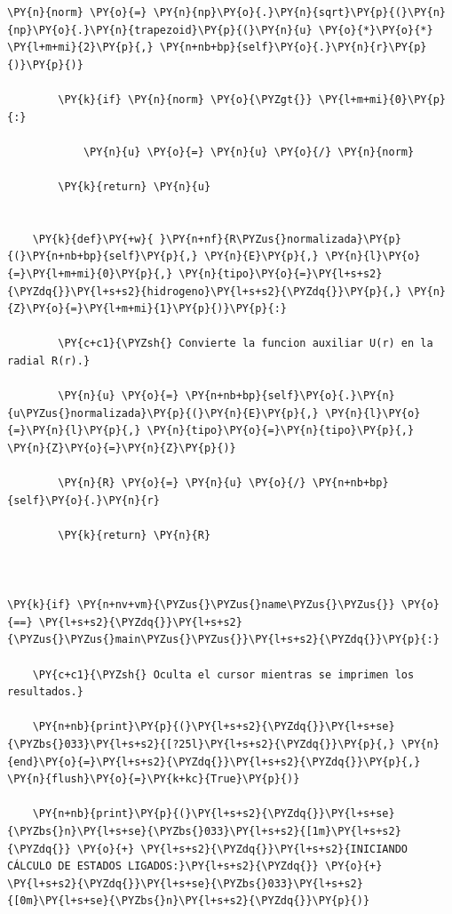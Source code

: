 \documentclass[11pt]{article}
\makeatletter
\def\PY@reset{\let\PY@it=\relax \let\PY@bf=\relax \let\PY@ul=\relax \let\PY@tc=\relax \let\PY@bc=\relax \let\PY@ff=\relax}
\def\PY@tok#1{\csname PY@tok@#1\endcsname}
\def\PY@toks#1+{\ifx\relax#1\empty\else \PY@tok{#1}\expandafter\PY@toks\fi}
\def\PY@do#1{\PY@bc{\PY@tc{\PY@ul{\PY@it{\PY@bf{\PY@ff{#1}}}}}}}
\def\PY#1#2{\PY@reset\PY@toks#1+\relax+\PY@do{#2}}
\def\PYZbs{\char`\\} \def\PYZus{\char`\_} \def\PYZob{\char`\{} \def\PYZcb{\char`\}} \def\PYZca{\char`\^} \def\PYZam{\char`\&} \def\PYZlt{\char`\<} \def\PYZgt{\char`\>} \def\PYZsh{\char`\#} \def\PYZpc{\char`\%} \def\PYZdl{\char`\$} \def\PYZhy{\char`\-} \def\PYZsq{\char`\'} \def\PYZdq{\char`\"} \def\PYZti{\char`\~}
\makeatother
\begin{document}
\begin{tcolorbox}[breakable, size=fbox, boxrule=1pt, pad at break*=1mm,colback=cellbackground, colframe=cellborder]
\begin{Verbatim}[commandchars=\\\{\}]
        \PY{n}{norm} \PY{o}{=} \PY{n}{np}\PY{o}{.}\PY{n}{sqrt}\PY{p}{(}\PY{n}{np}\PY{o}{.}\PY{n}{trapezoid}\PY{p}{(}\PY{n}{u} \PY{o}{*}\PY{o}{*} \PY{l+m+mi}{2}\PY{p}{,} \PY{n+nb+bp}{self}\PY{o}{.}\PY{n}{r}\PY{p}{)}\PY{p}{)}

        \PY{k}{if} \PY{n}{norm} \PY{o}{\PYZgt{}} \PY{l+m+mi}{0}\PY{p}{:}

            \PY{n}{u} \PY{o}{=} \PY{n}{u} \PY{o}{/} \PY{n}{norm}

        \PY{k}{return} \PY{n}{u}


    \PY{k}{def}\PY{+w}{ }\PY{n+nf}{R\PYZus{}normalizada}\PY{p}{(}\PY{n+nb+bp}{self}\PY{p}{,} \PY{n}{E}\PY{p}{,} \PY{n}{l}\PY{o}{=}\PY{l+m+mi}{0}\PY{p}{,} \PY{n}{tipo}\PY{o}{=}\PY{l+s+s2}{\PYZdq{}}\PY{l+s+s2}{hidrogeno}\PY{l+s+s2}{\PYZdq{}}\PY{p}{,} \PY{n}{Z}\PY{o}{=}\PY{l+m+mi}{1}\PY{p}{)}\PY{p}{:}

        \PY{c+c1}{\PYZsh{} Convierte la funcion auxiliar U(r) en la radial R(r).}

        \PY{n}{u} \PY{o}{=} \PY{n+nb+bp}{self}\PY{o}{.}\PY{n}{u\PYZus{}normalizada}\PY{p}{(}\PY{n}{E}\PY{p}{,} \PY{n}{l}\PY{o}{=}\PY{n}{l}\PY{p}{,} \PY{n}{tipo}\PY{o}{=}\PY{n}{tipo}\PY{p}{,} \PY{n}{Z}\PY{o}{=}\PY{n}{Z}\PY{p}{)}

        \PY{n}{R} \PY{o}{=} \PY{n}{u} \PY{o}{/} \PY{n+nb+bp}{self}\PY{o}{.}\PY{n}{r}

        \PY{k}{return} \PY{n}{R}



\PY{k}{if} \PY{n+nv+vm}{\PYZus{}\PYZus{}name\PYZus{}\PYZus{}} \PY{o}{==} \PY{l+s+s2}{\PYZdq{}}\PY{l+s+s2}{\PYZus{}\PYZus{}main\PYZus{}\PYZus{}}\PY{l+s+s2}{\PYZdq{}}\PY{p}{:}

    \PY{c+c1}{\PYZsh{} Oculta el cursor mientras se imprimen los resultados.}

    \PY{n+nb}{print}\PY{p}{(}\PY{l+s+s2}{\PYZdq{}}\PY{l+s+se}{\PYZbs{}033}\PY{l+s+s2}{[?25l}\PY{l+s+s2}{\PYZdq{}}\PY{p}{,} \PY{n}{end}\PY{o}{=}\PY{l+s+s2}{\PYZdq{}}\PY{l+s+s2}{\PYZdq{}}\PY{p}{,} \PY{n}{flush}\PY{o}{=}\PY{k+kc}{True}\PY{p}{)}

    \PY{n+nb}{print}\PY{p}{(}\PY{l+s+s2}{\PYZdq{}}\PY{l+s+se}{\PYZbs{}n}\PY{l+s+se}{\PYZbs{}033}\PY{l+s+s2}{[1m}\PY{l+s+s2}{\PYZdq{}} \PY{o}{+} \PY{l+s+s2}{\PYZdq{}}\PY{l+s+s2}{INICIANDO CÁLCULO DE ESTADOS LIGADOS:}\PY{l+s+s2}{\PYZdq{}} \PY{o}{+} \PY{l+s+s2}{\PYZdq{}}\PY{l+s+se}{\PYZbs{}033}\PY{l+s+s2}{[0m}\PY{l+s+se}{\PYZbs{}n}\PY{l+s+s2}{\PYZdq{}}\PY{p}{)}

    


\end{Verbatim}
\end{tcolorbox}
\end{document}
